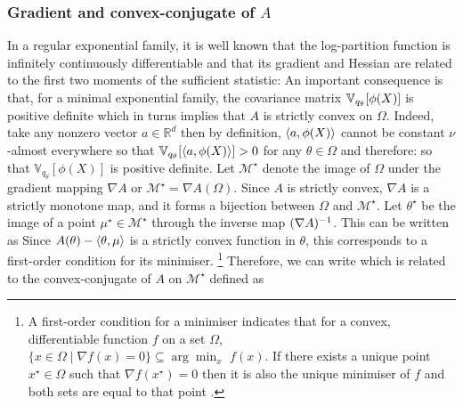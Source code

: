 \subsubsection*{Gradient and convex-conjugate of $A$}
In a regular exponential family, it is well known \citep[theorem 2.2]{brown86} that the log-partition function is infinitely continuously differentiable and that its gradient and Hessian are related to the first two moments of the sufficient statistic:
%
%
An important consequence is that, for a minimal exponential family, the covariance matrix $\mathbb V_{q_\theta}[\phi(X)]$ is positive definite which in turns implies that $A$ is strictly convex on $\Omega$. Indeed, take any nonzero vector $a\in\mathbb R^{d}$ then by definition, $\left\langle a,\phi(X) \right\rangle$ cannot be constant $\nu$-almost everywhere so that $\mathbb V_{q_{\theta}}[\left\langle a,\phi(X) \right\rangle] > 0$ for any $\theta\in\Omega$ and therefore:
so that $\mathbb V_{q_{\theta}}[\phi(X)]$ is positive definite. 
Let $\mathcal M^{\star}$ denote the image of $\Omega$ under the gradient mapping $\nabla A$ or $\mathcal M^{\star}=\nabla A(\Omega)$. Since $A$ is strictly convex, $\nabla A$ is a strictly monotone map, and it forms a bijection between $\Omega$ and $\mathcal M^{\star}$. Let $\theta^{\star}$ be the image of a point $\mu^{\star}\in\mathcal M^{\star}$ through the inverse map $(\nabla A)^{-1}$. 
This can be written as
%
%
Since $A(\theta)-\left\langle \theta,\mu \right\rangle$ is a strictly convex function in $\theta$, this corresponds to a first-order condition for its minimiser.
\footnote{A first-order condition for a minimiser indicates that for a convex, differentiable function $f$ on a set $\Omega$, $\{x\in\Omega\mid \nabla f(x)=0 \}\subseteq\arg\min_{x}\,\,f(x)$. If there exists a unique point $x^{\star}\in\Omega$ such that $\nabla f(x^{\star})=0$ then it is also the unique minimiser of $f$ and both sets are equal to that point \citep[theorem 27.1]{rockafellar70}. } Therefore, we can write
%
%
which is related to the convex-conjugate of $A$ on $\mathcal M^{\star}$ defined as

